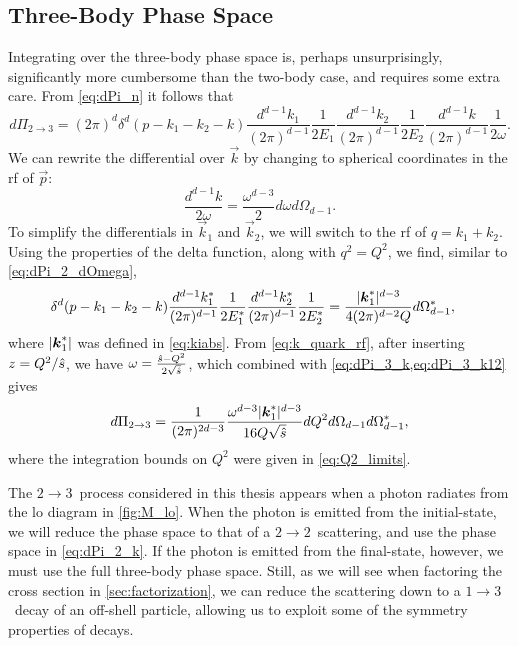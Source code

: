 \subsection{Three-Body Phase Space}\label{sec:three_body_phase_space}
Integrating over the three-body phase space is, perhaps unsurprisingly, significantly more cumbersome than the two-body case, and requires some extra care.
From \cref{eq:dPi_n} it follows that
\begin{equation}
    d\Pi_{2\to 3} = (2\pi)^d \delta^d(p-k_1-k_2-k) 
    \frac{d^{d-1}k_1}{(2\pi)^{d-1}}\frac{1}{2E_1}
    \frac{d^{d-1}k_2}{(2\pi)^{d-1}}\frac{1}{2E_2}
    \frac{d^{d-1}k}{(2\pi)^{d-1}}\frac{1}{2\omega}.
    \label{eq:dPi_3_general}
\end{equation}
We can rewrite the differential over $\vec{k}$ by changing to spherical coordinates in the \gls{rf} of $\vec{p}$:
\begin{equation}
    \frac{d^{d-1}k}{2\omega} = \frac{\omega^{d-3}}{2} d\omega d\Omega_{d-1}.
    \label{eq:dPi_3_k}
\end{equation}
To simplify the differentials in $\vec{k}_1$ and $\vec{k}_2$, we will switch to the \gls{rf} of $q=k_1+k_2$. Using the properties of the delta function, along with $q^2=Q^2$, we find, similar to \cref{eq:dPi_2_dOmega},
\begin{align}
    \delta^d(p-k_1-k_2-k) 
    \frac{d^{d-1}k_1^*}{(2\pi)^{d-1}}\frac{1}{2E_1^*}
    \frac{d^{d-1}k_2^*}{(2\pi)^{d-1}}\frac{1}{2E_2^*}
    &= \frac{\lvert\boldsymbol{k}_1^*\rvert^{d-3}}{4(2\pi)^{d-2}Q} d\Omega^*_{d-1},
    \label{eq:dPi_3_k12}
\end{align}
where $\lvert\boldsymbol{k}_1^*\rvert$ was defined in \cref{eq:kiabs}.
From \cref{eq:k_quark_rf}, after inserting $z=Q^2/\hat{s}$, we have $\omega = \frac{\hat{s}-Q^2}{2\sqrt{\hat{s}}}$, which combined with \cref{eq:dPi_3_k,eq:dPi_3_k12} gives
\begin{equation}
    d\Pi_{2\to3} = \frac{1}{(2\pi)^{2d-3}} \frac{\omega^{d-3}\lvert\boldsymbol{k}_1^*\rvert^{d-3}}{16Q\sqrt{\hat{s}}} dQ^2 d\Omega_{d-1} d\Omega_{d-1}^*,
    \label{eq:dPi_3}
\end{equation}
where the integration bounds on $Q^2$ were given in \cref{eq:Q2_limits}.

The $2\to3$~process considered in this thesis appears when a photon radiates from the \gls{lo} diagram in \cref{fig:M_lo}. When the photon is emitted from the initial-state, we will reduce the phase space to that of a $2\to2$~scattering, and use the phase space in \cref{eq:dPi_2_k}.
If the photon is emitted from the final-state, however, we must use the full three-body phase space.
Still, as we will see when factoring the cross section in \cref{sec:factorization}, we can reduce the scattering down to a $1\to3$~decay of an off-shell particle, allowing us to exploit some of the symmetry properties of decays.

